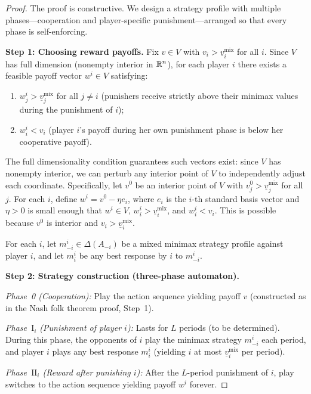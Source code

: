\documentclass[11pt,a4paper]{article}
\begin{document}
\begin{proof}
The proof is constructive. We design a strategy profile with multiple
phases---cooperation and player-specific punishment---arranged so that
every phase is self-enforcing.

\textbf{Step 1: Choosing reward payoffs.}
Fix $v \in V$ with $v_i > \underline{v}_i^{\mathrm{mix}}$ for all $i$.
Since $V$ has full dimension (nonempty interior in $\mathbb{R}^n$), for each
player $i$ there exists a feasible payoff vector $w^i \in V$ satisfying:
\begin{enumerate}[label=(\roman*)]
    \item $w^i_j > \underline{v}_j^{\mathrm{mix}}$ for all $j \neq i$
    (punishers receive strictly above their minimax values during the
    punishment of $i$);
    \item $w^i_i < v_i$ (player $i$'s payoff during her own punishment
    phase is below her cooperative payoff).
\end{enumerate}
The full dimensionality condition guarantees such vectors exist: since $V$
has nonempty interior, we can perturb any interior point of $V$ to
independently adjust each coordinate. Specifically, let $v^0$ be an
interior point of $V$ with $v^0_j > \underline{v}_j^{\mathrm{mix}}$ for
all $j$. For each $i$, define $w^i = v^0 - \eta e_i$, where $e_i$ is the
$i$-th standard basis vector and $\eta > 0$ is small enough that
$w^i \in V$, $w^i_i > \underline{v}_i^{\mathrm{mix}}$, and $w^i_i < v_i$.
This is possible because $v^0$ is interior and
$v_i > \underline{v}_i^{\mathrm{mix}}$.

For each $i$, let $m^i_{-i} \in \Delta(A_{-i})$ be a mixed minimax
strategy profile against player $i$, and let $m^i_i$ be any best response
by $i$ to $m^i_{-i}$.

\textbf{Step 2: Strategy construction (three-phase automaton).}

\emph{Phase~0 (Cooperation):} Play the action sequence yielding payoff $v$
(constructed as in the Nash folk theorem proof, Step~1).

\emph{Phase~$\mathrm{I}_i$ (Punishment of player $i$):} Lasts for $L$
periods (to be determined). During this phase, the opponents of $i$ play
the minimax strategy $m^i_{-i}$ each period, and player $i$ plays any best
response $m^i_i$ (yielding $i$ at most
$\underline{v}_i^{\mathrm{mix}}$ per period).

\emph{Phase~$\mathrm{II}_i$ (Reward after punishing $i$):} After the
$L$-period punishment of $i$, play switches to the action sequence yielding
payoff $w^i$ forever.


\end{proof}
\end{document}
